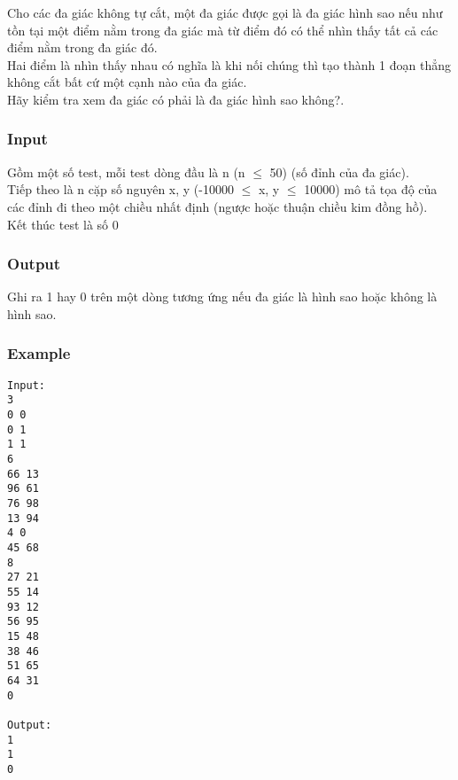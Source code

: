 



   Cho các đa giác không tự cắt, một đa giác được gọi là đa giác hình sao nếu như tồn tại một điểm nằm trong đa giác mà từ điểm đó có thể nhìn thấy tất cả các điểm nằm trong đa giác đó.   
\\   Hai điểm là nhìn thấy nhau có nghĩa là khi nối chúng thì tạo thành 1 đoạn thẳng không cắt bất cứ một cạnh nào của đa giác.   
\\   Hãy kiểm tra xem đa giác có phải là đa giác hình sao không?.  

\subsubsection{   Input  }

   Gồm một số test, mỗi test dòng đầu là n (n  $\le$  50) (số đỉnh của đa giác).   
\\   Tiếp theo là n cặp số nguyên x, y (-10000  $\le$  x, y  $\le$  10000) mô tả tọa độ của các đỉnh đi theo một chiều nhất định (ngược hoặc thuận chiều kim đồng hồ).   
\\   Kết thúc test là số 0  

\subsubsection{   Output  }

   Ghi ra 1 hay 0 trên một dòng tương ứng nếu đa giác là hình sao hoặc không là hình sao.  

\subsubsection{   Example  }
\begin{verbatim}
Input:
3
0 0
0 1
1 1
6
66 13
96 61
76 98
13 94
4 0
45 68
8
27 21
55 14
93 12
56 95
15 48
38 46
51 65
64 31
0

Output:
1
1
0
\end{verbatim}
